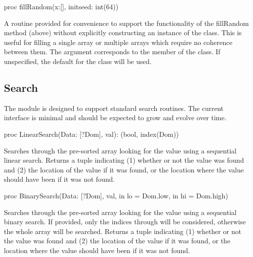 \begin{protohead}
proc fillRandom(x:[], initseed: int(64))
\end{protohead}
\begin{protobody}
A routine provided for convenience to support the functionality of the
fillRandom method (above) without explicitly constructing an instance
of the  class.  This is useful for filling a single
array or multiple arrays which require no coherence between them.
The  argument corresponds to the  member of
the  class.  If unspecified, the default for the
class will be used.
\end{protobody}


\subsection{Search}
\label{Search}

The  module is designed to support standard search
routines.  The current interface is minimal and should be expected to
grow and evolve over time.

\begin{protohead}
proc LinearSearch(Data: [?Dom], val): (bool, index(Dom))
\end{protohead}
\begin{protobody}
Searches through the pre-sorted array  looking for the
value  using a sequential linear search.  Returns a tuple
indicating (1) whether or not the value was found and (2) the location
of the value if it was found, or the location where the value should
have been if it was not found.
\end{protobody}

\begin{protohead}
proc BinarySearch(Data: [?Dom], val, in lo = Dom.low, in hi = Dom.high)
\end{protohead}
\begin{protobody}
Searches through the pre-sorted array  looking for the
value  using a sequential binary search.  If provided, only
the indices  through  will be considered, otherwise
the whole array will be searched.  Returns a tuple indicating (1)
whether or not the value was found and (2) the location of the value
if it was found, or the location where the value should have been if
it was not found.
\end{protobody}


